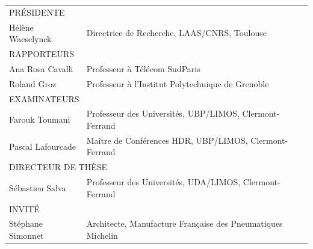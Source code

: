 \begin{titlepage}
    \begin{tabular}{l l}
    \multicolumn{2}{l}{\uppercase{Présidente}}\\
    Hélène Waeselynck & Directrice de Recherche, LAAS/CNRS, Toulouse\\
    \multicolumn{2}{l}{\uppercase{Rapporteurs}}\\
    Ana Rosa Cavalli & Professeur à Télécom SudParis\\
    Roland Groz & Professeur à l'Institut Polytechnique de Grenoble\\
    \multicolumn{2}{l}{\uppercase{Examinateurs}}\\
    Farouk Toumani & Professeur des Universités, UBP/LIMOS, Clermont-Ferrand\\
    Pascal Lafourcade & Maître de Conférences HDR, UBP/LIMOS, Clermont-Ferrand\\
    \multicolumn{2}{l}{\uppercase{Directeur de thèse}}\\
    S\'ebastien Salva & Professeur des Universités, UDA/LIMOS, Clermont-Ferrand\\
    \multicolumn{2}{l}{\uppercase{Invité}}\\
    St\'ephane Simonnet & Architecte, Manufacture Française des Pneumatiques Michelin
    \end{tabular}

\end{titlepage}
